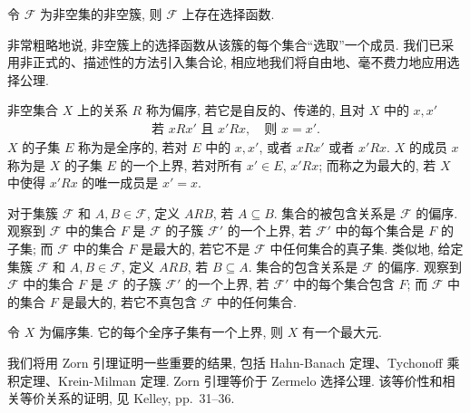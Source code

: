 \documentclass[../../main.tex]{subfiles}
\begin{document}
\begin{axiom}\label{axiom:ch00-选择公理}
令 $\mathcal{F}$ 为非空集的非空簇, 则 $\mathcal{F}$ 上存在选择函数.
\end{axiom}

非常粗略地说, 非空簇上的选择函数从该簇的每个集合“选取”一个成员. 我们已采用非正式的、描述性的方法引入集合论, 相应地我们将自由地、毫不费力地应用选择公理.

\begin{definition}[偏序、全序、上界与最大元]\label{definition:ch00-偏序}
非空集合 $X$ 上的关系 $R$ 称为偏序, 若它是自反的、传递的, 且对 $X$ 中的 $x,x'$
\begin{align*}
\text{若 }xRx'\text{ 且 }x'Rx,\quad\text{则 }x=x'.
\end{align*}
$X$ 的子集 $E$ 称为是全序的, 若对 $E$ 中的 $x,x'$, 或者 $xRx'$ 或者 $x'Rx$. $X$ 的成员 $x$ 称为是 $X$ 的子集 $E$ 的一个上界, 若对所有 $x'\in E$, $x'Rx$; 而称之为最大的, 若 $X$ 中使得 $x'Rx$ 的唯一成员是 $x'=x$.
\end{definition}

对于集簇 $\mathcal{F}$ 和 $A,B\in\mathcal{F}$, 定义 $ARB$, 若 $A\subseteq B$. 集合的被包含关系是 $\mathcal{F}$ 的偏序. 观察到 $\mathcal{F}$ 中的集合 $F$ 是 $\mathcal{F}$ 的子簇 $\mathcal{F}'$ 的一个上界, 若 $\mathcal{F}'$ 中的每个集合是 $F$ 的子集; 而 $\mathcal{F}$ 中的集合 $F$ 是最大的, 若它不是 $\mathcal{F}$ 中任何集合的真子集. 类似地, 给定集簇 $\mathcal{F}$ 和 $A,B\in\mathcal{F}$, 定义 $ARB$, 若 $B\subseteq A$. 集合的包含关系是 $\mathcal{F}$ 的偏序. 观察到 $\mathcal{F}$ 中的集合 $F$ 是 $\mathcal{F}$ 的子簇 $\mathcal{F}'$ 的一个上界, 若 $\mathcal{F}'$ 中的每个集合包含 $F$; 而 $\mathcal{F}$ 中的集合 $F$ 是最大的, 若它不真包含 $\mathcal{F}$ 中的任何集合.

\begin{lemma}[Zorn 引理]\label{lemma:ch00-zorn}
令 $X$ 为偏序集. 它的每个全序子集有一个上界, 则 $X$ 有一个最大元.
\end{lemma}

我们将用 Zorn 引理证明一些重要的结果, 包括 Hahn-Banach 定理、Tychonoff 乘积定理、Krein-Milman 定理. Zorn 引理等价于 Zermelo 选择公理. 该等价性和相关等价关系的证明, 见 Kelley\cite{Kel75}, pp.\ 31--36.
\end{document}
